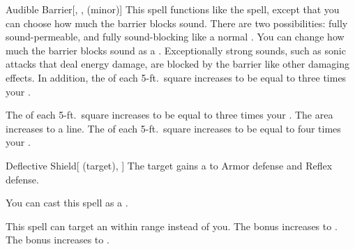 \lowercase{\hypertarget{spell:Audible Barrier}{}}\label{spell:Audible Barrier}
\begin{freeability}[Rank 2]{\hypertarget{spell:Audible Barrier}{Audible Barrier}}[, ,  (minor)]
\targetrule
This spell functions like the  spell, except that you can choose how much the barrier blocks sound.
There are two possibilities: fully sound-permeable, and fully sound-blocking like a normal .
You can change how much the barrier blocks sound as a .
Exceptionally strong sounds, such as sonic attacks that deal energy damage, are blocked by the barrier like other damaging effects.
In addition, the  of each 5-ft.\ square increases to be equal to three times your .

\rankline
{} The  of each 5-ft.\ square increases to be equal to three times your .
 The area increases to a \arealarge line.
 The  of each 5-ft.\ square increases to be equal to four times your .

\end{freeability}
\vspace{0.25em}



\lowercase{\hypertarget{spell:Deflective Shield}{}}\label{spell:Deflective Shield}
\begin{attuneability}[Rank 2]{\hypertarget{spell:Deflective Shield}{Deflective Shield}}[ (target), ]
The target gains a   to Armor defense and Reflex defense.

You can cast this spell as a .

\rankline
{} This spell can target an  within \rngmed range instead of you.
 The bonus increases to .
 The bonus increases to .

\end{attuneability}
\vspace{0.25em}



